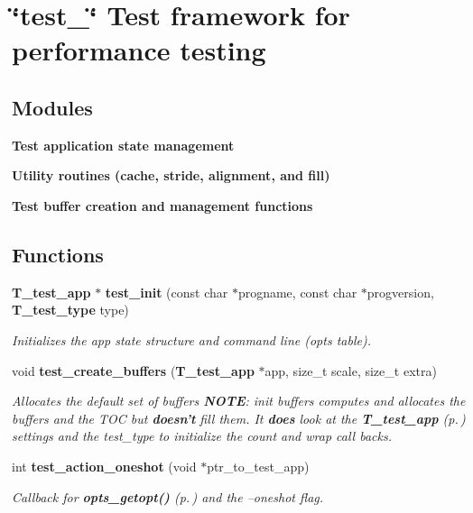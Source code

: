 \section{\char`\"{}test\_\-\char`\"{} Test framework for performance testing}
\label{group__test}
\subsection*{Modules}
\begin{CompactItemize}
\item 
{\bf Test application state management}
\item 
{\bf Utility routines (cache, stride, alignment, and fill)}
\item 
{\bf Test buffer creation and management functions}
\end{CompactItemize}
\subsection*{Functions}
\begin{CompactItemize}
\item 
{\bf T\_\-test\_\-app} $\ast$ {\bf test\_\-init} (const char $\ast$progname, const char $\ast$progversion, {\bf T\_\-test\_\-type} type)
\begin{CompactList}\small\item\em Initializes the app state structure and command line (opts table).\item\end{CompactList}\item 
void {\bf test\_\-create\_\-buffers} ({\bf T\_\-test\_\-app} $\ast$app, size\_\-t scale, size\_\-t extra)
\begin{CompactList}\small\item\em Allocates the default set of buffers {\bf NOTE}: init buffers computes and allocates the buffers and the TOC but {\bf doesn't} fill them. It {\bf does} look at the {\bf T\_\-test\_\-app} {\rm (p.\,\pageref{structT__test__app})} settings and the test\_\-type to initialize the count and wrap call backs.\item\end{CompactList}\item 
int {\bf test\_\-action\_\-oneshot} (void $\ast$ptr\_\-to\_\-test\_\-app)
\begin{CompactList}\small\item\em Callback for {\bf opts\_\-getopt()} {\rm (p.\,\pageref{group__opts_a3})} and the --oneshot flag.\item\end{CompactList}\end{CompactItemize}


